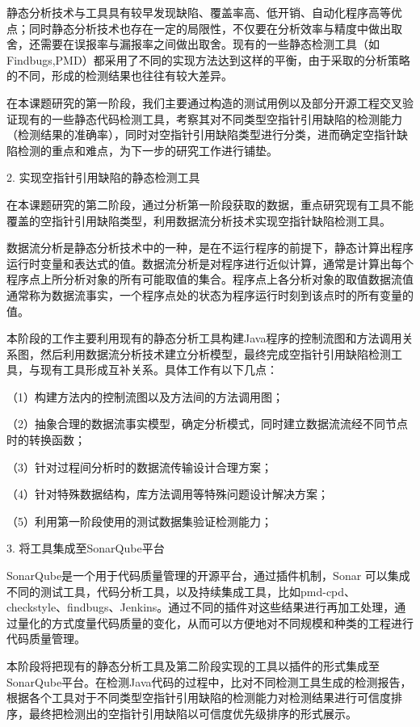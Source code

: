 静态分析技术与工具具有较早发现缺陷、覆盖率高、低开销、自动化程序高等优点；同时静态分析技术也存在一定的局限性，不仅要在分析效率与精度中做出取舍，还需要在误报率与漏报率之间做出取舍。现有的一些静态检测工具（如Findbugs,PMD）都采用了不同的实现方法达到这样的平衡，由于采取的分析策略的不同，形成的检测结果也往往有较大差异。

在本课题研究的第一阶段，我们主要通过构造的测试用例以及部分开源工程交叉验证现有的一些静态代码检测工具，考察其对不同类型空指针引用缺陷的检测能力（检测结果的准确率），同时对空指针引用缺陷类型进行分类，进而确定空指针缺陷检测的重点和难点，为下一步的研究工作进行铺垫。

2. 实现空指针引用缺陷的静态检测工具

在本课题研究的第二阶段，通过分析第一阶段获取的数据，重点研究现有工具不能覆盖的空指针引用缺陷类型，利用数据流分析技术实现空指针缺陷检测工具。

数据流分析是静态分析技术中的一种，是在不运行程序的前提下，静态计算出程序运行时变量和表达式的值。数据流分析是对程序进行近似计算，通常是计算出每个程序点上所分析对象的所有可能取值的集合。程序点上各分析对象的取值数据流值通常称为数据流事实，一个程序点处的状态为程序运行时刻到该点时的所有变量的值。

本阶段的工作主要利用现有的静态分析工具构建Java程序的控制流图和方法调用关系图，然后利用数据流分析技术建立分析模型，最终完成空指针引用缺陷检测工具，与现有工具形成互补关系。具体工作有以下几点：

（1）构建方法内的控制流图以及方法间的方法调用图；

（2）抽象合理的数据流事实模型，确定分析模式，同时建立数据流流经不同节点时的转换函数；

（3）针对过程间分析时的数据流传输设计合理方案；

（4）针对特殊数据结构，库方法调用等特殊问题设计解决方案；

（5）利用第一阶段使用的测试数据集验证检测能力；

3. 将工具集成至SonarQube平台

SonarQube是一个用于代码质量管理的开源平台，通过插件机制，Sonar 可以集成不同的测试工具，代码分析工具，以及持续集成工具，比如pmd-cpd、checkstyle、findbugs、Jenkins。通过不同的插件对这些结果进行再加工处理，通过量化的方式度量代码质量的变化，从而可以方便地对不同规模和种类的工程进行代码质量管理。

本阶段将把现有的静态分析工具及第二阶段实现的工具以插件的形式集成至SonarQube平台。在检测Java代码的过程中，比对不同检测工具生成的检测报告，根据各个工具对于不同类型空指针引用缺陷的检测能力对检测结果进行可信度排序，最终把检测出的空指针引用缺陷以可信度优先级排序的形式展示。




